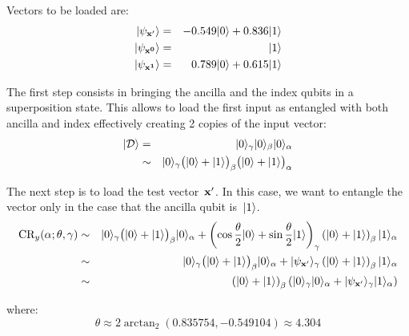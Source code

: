 \documentclass{article}
\DeclarePairedDelimiter\ket{\lvert}{\rangle}
\begin{document}
\noindent Vectors to be loaded are:
\begin{eqnarray*}
\ket{\psi_{\bf x^\prime}} &=& -0.549 \ket{0} + 0.836 \ket{1} \\
\ket{\psi_{\bf x^0}} &=&  \ket{1} \\
\ket{\psi_{\bf x^1}} &=&  0.789 \ket{0} + 0.615 \ket{1} \\
\end{eqnarray*}

\noindent The first step consists in bringing the ancilla and the index qubits in a superposition state. This allows to load the first input as entangled with both ancilla and index effectively creating 2 copies of the input vector:
\begin{eqnarray*}
\ket{\mathcal{D}} &=& \ket{0}_\gamma \ket{0}_\beta \ket{0}_\alpha \\
 &\sim& \ket{0}_\gamma \big( \ket{0} + \ket{1} \big)_\beta \big( \ket{0} + \ket{1} \big)_\alpha
\end{eqnarray*}


\noindent The next step is to load the test vector~${\bf x}^{\prime}$.  In this case, we want to entangle the vector only in the case that the ancilla qubit is~$\ket{1}$.
\begin{eqnarray*}
\mbox{CR}_y(\alpha ;\theta, \gamma) &\sim& \ket{0}_\gamma \big( \ket{0} + \ket{1} \big)_\beta \ket{0}_\alpha + \left( \cos \frac{\theta}{2} \ket{0} +	 \sin \frac{\theta}{2}\ket{1} \right)_\gamma \left( \ket{0} + \ket{1} \right)_\beta \ket{1}_\alpha   \\
&\sim&  \ket{0}_\gamma \big( \ket{0} + \ket{1} \big)_\beta \ket{0}_\alpha + \ket{\psi_{\bf x^\prime}}_\gamma \left( \ket{0} + \ket{1} \right)_\beta \ket{1}_\alpha \\
&\sim&  \left( \ket{0} + \ket{1} \right)_\beta \left( \ket{0}_\gamma  \ket{0}_\alpha + \ket{\psi_{\bf x^\prime}}_\gamma \ket{1}_\alpha \right)
\end{eqnarray*}

\noindent where:
\begin{equation*}
\theta \approx 2 \arctan_2(0.835754, -0.549104) \approx 4.304
\end{equation*}
\end{document}

